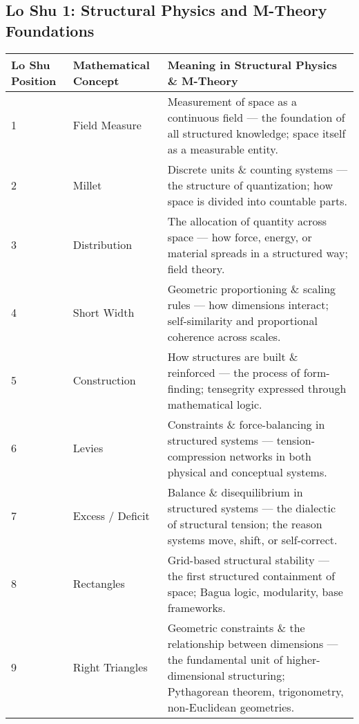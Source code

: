 \documentclass{article}
\begin{document}
\begin{landscape}

\section*{Lo Shu 1: Structural Physics and M-Theory Foundations}

\renewcommand{\arraystretch}{1.4}

\begin{tabular}{|p{1.8cm}|p{4.5cm}|p{9.5cm}|}
\hline
\textbf{Lo Shu Position} & 
\textbf{Mathematical Concept} & 
\textbf{Meaning in Structural Physics \& M-Theory} \\
\hline

1 & 
Field Measure & 
Measurement of space as a continuous field — the foundation of all structured knowledge; space itself as a measurable entity. \\
\hline

2 & 
Millet & 
Discrete units \& counting systems — the structure of quantization; how space is divided into countable parts. \\
\hline

3 & 
Distribution & 
The allocation of quantity across space — how force, energy, or material spreads in a structured way; field theory. \\
\hline

4 & 
Short Width & 
Geometric proportioning \& scaling rules — how dimensions interact; self-similarity and proportional coherence across scales. \\
\hline

5 & 
Construction & 
How structures are built \& reinforced — the process of form-finding; tensegrity expressed through mathematical logic. \\
\hline

6 & 
Levies & 
Constraints \& force-balancing in structured systems — tension-compression networks in both physical and conceptual systems. \\
\hline

7 & 
Excess / Deficit & 
Balance \& disequilibrium in structured systems — the dialectic of structural tension; the reason systems move, shift, or self-correct. \\
\hline

8 & 
Rectangles & 
Grid-based structural stability — the first structured containment of space; Bagua logic, modularity, base frameworks. \\
\hline

9 & 
Right Triangles & 
Geometric constraints \& the relationship between dimensions — the fundamental unit of higher-dimensional structuring; Pythagorean theorem, trigonometry, non-Euclidean geometries. \\
\hline

\end{tabular}

\end{landscape}
\end{document}
